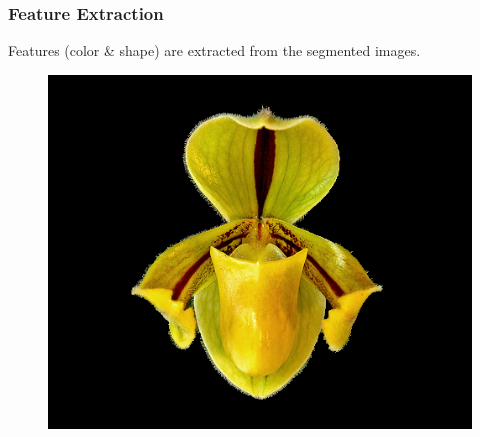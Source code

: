 \documentclass[]{beamer}
\begin{document}
    \begin{frame}
        \frametitle{Feature Extraction}

        Features (color \& shape) are extracted from the segmented images.

        \vspace{10 mm}

        \begin{figure}[!htb]
              \includegraphics[width=\linewidth]{grabcut_output}
            \endminipage\hfill
        \end{figure}
    \end{frame}

\end{document}
